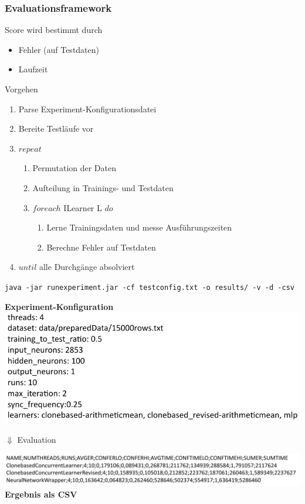 \documentclass[18pt]{beamer}
\begin{document}
	\begin{frame}[allowframebreaks]\frametitle{Evaluationsframework}
		\begin{block}{Score}
			wird bestimmt durch
		    \begin{itemize}
		    	\item Fehler (auf Testdaten)
		    	\item Laufzeit
		    \end{itemize}
		\end{block}
	\framebreak
		\begin{block}{Vorgehen}
		    \begin{enumerate}
				\item Parse Experiment-Konfigurationsdatei
				\item Bereite Testläufe vor
				\item $repeat$
				\begin{enumerate}
					\item Permutation der Daten
					\item Aufteilung in Trainings- und Testdaten
					\item $foreach$ ILearner L $do$
					\begin{enumerate}
						\item Lerne Trainingsdaten und messe Ausführungszeiten
						\item Berechne Fehler auf Testdaten
					\end{enumerate}
				\end{enumerate}
				\item $until$ alle Durchgänge absolviert
		    \end{enumerate}
		\end{block}
		
	\framebreak
		
		\texttt{{\footnotesize java -jar runexperiment.jar -cf testconfig.txt -o results/ -v -d -csv}}
		\begin{center}
			\textbf{{\tiny Experiment-Konfiguration}}
			\newline
			\includegraphics[scale=0.5]{Grafiken/testconfig}
		\end{center}
		\begin{center}	
			{\huge $\Downarrow$} {\small Evaluation}
		\end{center}
		\begin{center}
			\includegraphics[scale=0.5]{Grafiken/csv}
			\newline
			\textbf{{\tiny Ergebnis als CSV}}
		\end{center}
	\end{frame}
\end{document}
